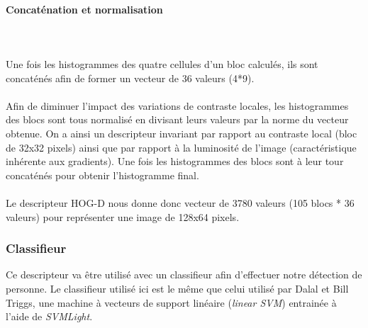 \documentclass[12pt]{article}
\begin{document}
\paragraph{Concaténation et normalisation}~\\
\\
Une fois les histogrammes des quatre cellules d'un bloc calculés, ils sont concaténés afin de former un vecteur de 36 valeurs (4*9).\\
\\
Afin de diminuer l'impact des variations de contraste locales, les histogrammes des blocs sont tous normalisé en divisant leurs valeurs par la norme du vecteur obtenue. On a ainsi un descripteur invariant par rapport au contraste local (bloc de 32x32 pixels) ainsi que par rapport à la luminosité de l'image (caractéristique inhérente aux gradients).
Une fois les histogrammes des blocs sont à leur tour concaténés pour obtenir l'histogramme final.\\
\\
Le descripteur HOG-D nous donne donc vecteur de 3780 valeurs (105 blocs * 36 valeurs) pour représenter une image de 128x64 pixels.
\subsubsection{Classifieur}
Ce descripteur va être utilisé avec un classifieur afin d'effectuer notre détection de personne. Le classifieur utilisé ici est le même que celui utilisé par Dalal et Bill Triggs, une machine à vecteurs de support linéaire (\textit{linear SVM}) entrainée à l'aide de \textit{SVMLight}.
\end{document}
